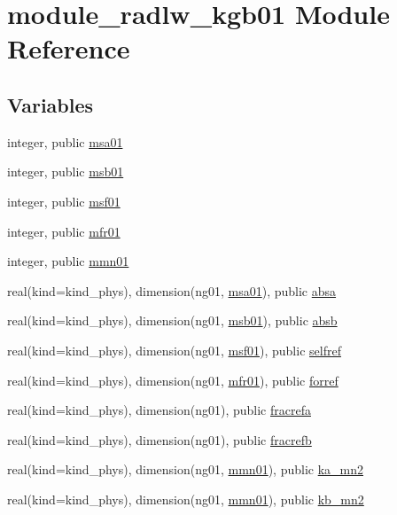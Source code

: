 \hypertarget{namespacemodule__radlw__kgb01}{}\section{module\+\_\+radlw\+\_\+kgb01 Module Reference}
\label{namespacemodule__radlw__kgb01}
\subsection*{Variables}
\begin{DoxyCompactItemize}
\item 
integer, public \hyperlink{namespacemodule__radlw__kgb01_a60db2a67b7f03a52fa88acd2c7874dfc}{msa01}
\item 
integer, public \hyperlink{group__module__radlw__main_gae34d953adc793ad27a294864e3e0e354}{msb01}
\item 
integer, public \hyperlink{group__module__radlw__main_ga321c2e84e14d28142d08bb5fbe485a67}{msf01}
\item 
integer, public \hyperlink{group__module__radlw__main_ga4bd2e710d96291436f9ee36e99816a19}{mfr01}
\item 
integer, public \hyperlink{group__module__radlw__main_ga218c6844f9043f362571f091a4f80522}{mmn01}
\item 
real(kind=kind\+\_\+phys), dimension(ng01, \hyperlink{namespacemodule__radlw__kgb01_a60db2a67b7f03a52fa88acd2c7874dfc}{msa01}), public \hyperlink{group__module__radlw__main_gacdbe767d50d503c4a89d4042dd0dee8e}{absa}
\item 
real(kind=kind\+\_\+phys), dimension(ng01, \hyperlink{group__module__radlw__main_gae34d953adc793ad27a294864e3e0e354}{msb01}), public \hyperlink{group__module__radlw__main_gabdaefe1c38d8bfcac5ef9b878fac77cb}{absb}
\item 
real(kind=kind\+\_\+phys), dimension(ng01, \hyperlink{group__module__radlw__main_ga321c2e84e14d28142d08bb5fbe485a67}{msf01}), public \hyperlink{group__module__radlw__main_ga14c7cc68b26c0ab1fdfda6faa2d485d5}{selfref}
\item 
real(kind=kind\+\_\+phys), dimension(ng01, \hyperlink{group__module__radlw__main_ga4bd2e710d96291436f9ee36e99816a19}{mfr01}), public \hyperlink{group__module__radlw__main_gacd70a32f88808dc40c39edee5b76adbe}{forref}
\item 
real(kind=kind\+\_\+phys), dimension(ng01), public \hyperlink{group__module__radlw__main_ga0bca660247ac37483cd55c6936056631}{fracrefa}
\item 
real(kind=kind\+\_\+phys), dimension(ng01), public \hyperlink{group__module__radlw__main_ga19b6a3893965817e82c77bee1de536cd}{fracrefb}
\item 
real(kind=kind\+\_\+phys), dimension(ng01, \hyperlink{group__module__radlw__main_ga218c6844f9043f362571f091a4f80522}{mmn01}), public \hyperlink{group__module__radlw__main_ga0a4f08c625f2f25f132200811af42331}{ka\+\_\+mn2}
\item 
real(kind=kind\+\_\+phys), dimension(ng01, \hyperlink{group__module__radlw__main_ga218c6844f9043f362571f091a4f80522}{mmn01}), public \hyperlink{group__module__radlw__main_gac357df5f66a7e384e22db58203ac294a}{kb\+\_\+mn2}
\end{DoxyCompactItemize}


